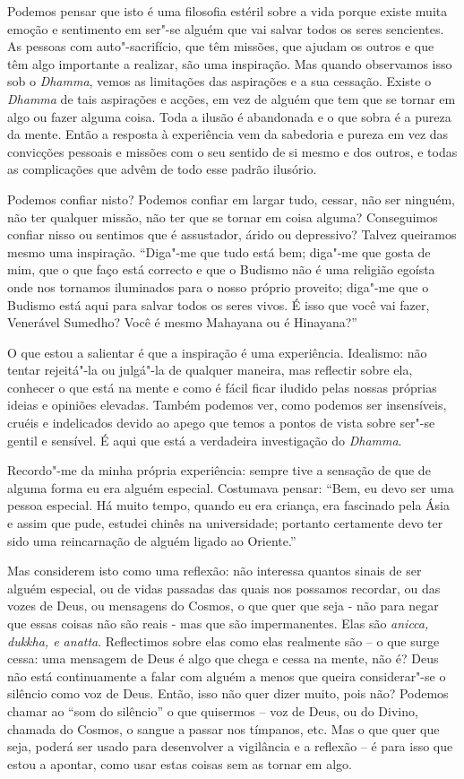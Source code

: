 Podemos pensar que isto é uma filosofia estéril sobre a vida porque
existe muita emoção e sentimento em ser"-se alguém que vai salvar todos
os seres sencientes. As pessoas com auto"-sacrifício, que têm missões,
que ajudam os outros e que têm algo importante a realizar, são uma
inspiração. Mas quando observamos isso sob o \emph{Dhamma}, vemos as
limitações das aspirações e a sua cessação. Existe o \emph{Dhamma} de
tais aspirações e acções, em vez de alguém que tem que se tornar em algo
ou fazer alguma coisa. Toda a ilusão é abandonada e o que sobra é a
pureza da mente. Então a resposta à experiência vem da sabedoria e
pureza em vez das convicções pessoais e missões com o seu sentido de si
mesmo e dos outros, e todas as complicações que advêm de todo esse
padrão ilusório.

Podemos confiar nisto? Podemos confiar em largar tudo, cessar, não ser
ninguém, não ter qualquer missão, não ter que se tornar em coisa alguma?
Conseguimos confiar nisso ou sentimos que é assustador, árido ou
depressivo? Talvez queiramos mesmo uma inspiração. ``Diga"-me que tudo
está bem; diga"-me que gosta de mim, que o que faço está correcto e que o
Budismo não é uma religião egoísta onde nos tornamos iluminados para o
nosso próprio proveito; diga"-me que o Budismo está aqui para salvar
todos os seres vivos. É isso que você vai fazer, Venerável Sumedho? Você
é mesmo Mahayana ou é Hinayana?''

O que estou a salientar é que a inspiração é uma experiência. Idealismo:
não tentar rejeitá"-la ou julgá"-la de qualquer maneira, mas reflectir
sobre ela, conhecer o que está na mente e como é fácil ficar iludido
pelas nossas próprias ideias e opiniões elevadas. Também podemos ver,
como podemos ser insensíveis, cruéis e indelicados devido ao apego que
temos a pontos de vista sobre ser"-se gentil e sensível. É aqui que está
a verdadeira investigação do \emph{Dhamma}.

Recordo"-me da minha própria experiência: sempre tive a sensação de que
de alguma forma eu era alguém especial. Costumava pensar: ``Bem, eu devo
ser uma pessoa especial. Há muito tempo, quando eu era criança, era
fascinado pela Ásia e assim que pude, estudei chinês na universidade;
portanto certamente devo ter sido uma reincarnação de alguém ligado ao
Oriente.''

Mas considerem isto como uma reflexão: não interessa quantos sinais de
ser alguém especial, ou de vidas passadas das quais nos possamos
recordar, ou das vozes de Deus, ou mensagens do Cosmos, o que quer que
seja - não para negar que essas coisas não são reais - mas que são
impermanentes. Elas são \emph{anicca, dukkha, e anatta}. Reflectimos
sobre elas como elas realmente são -- o que surge cessa: uma mensagem de
Deus é algo que chega e cessa na mente, não é? Deus não está
continuamente a falar com alguém a menos que queira considerar"-se o
silêncio como voz de Deus. Então, isso não quer dizer muito, pois não?
Podemos chamar ao ``som do silêncio'' o que quisermos -- voz de Deus, ou
do Divino, chamada do Cosmos, o sangue a passar nos tímpanos, etc. Mas o
que quer que seja, poderá ser usado para desenvolver a vigilância e a
reflexão -- é para isso que estou a apontar, como usar estas coisas sem
as tornar em algo.


